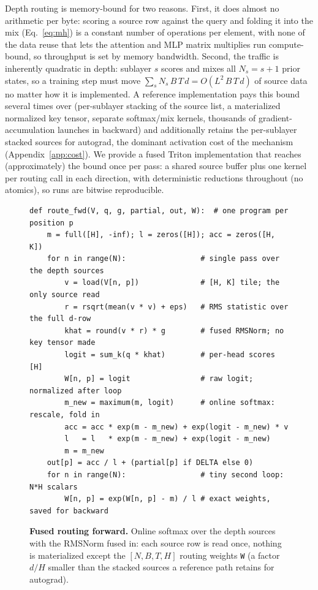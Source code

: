 \documentclass{article}
\begin{document}
Depth routing is memory-bound for two reasons. First, it does almost no
arithmetic per byte: scoring a source row against the query and folding it into
the mix (Eq.~\ref{eq:mh}) is a constant number of operations per element, with
none of the data reuse that lets the attention and MLP matrix multiplies run
compute-bound, so throughput is set by memory bandwidth. Second, the traffic is
inherently quadratic in depth: sublayer $s$ scores and mixes all $N_s{=}s{+}1$
prior states, so a training step must move
$\sum_s N_s\,B\,T\,d = O(L^2\,B\,T\,d)$ of source data no matter how it is
implemented. A reference implementation pays this bound several times over
(per-sublayer stacking of the source list, a materialized normalized key tensor,
separate softmax/mix kernels, thousands of gradient-accumulation launches in
backward) and additionally retains the per-sublayer stacked sources for
autograd, the dominant activation cost of the mechanism (Appendix~\ref{app:cost}). We provide a fused Triton implementation
that reaches (approximately) the bound once per pass: a shared source buffer plus
one kernel per routing call in each direction, with deterministic reductions
throughout (no atomics), so runs are bitwise reproducible.

\begin{figure}[h]
\begin{lstlisting}[style=mhar]
def route_fwd(V, q, g, partial, out, W):  # one program per position p
    m = full([H], -inf); l = zeros([H]); acc = zeros([H, K])
    for n in range(N):                 # single pass over the depth sources
        v = load(V[n, p])              # [H, K] tile; the only source read
        r = rsqrt(mean(v * v) + eps)   # RMS statistic over the full d-row
        khat = round(v * r) * g        # fused RMSNorm; no key tensor made
        logit = sum_k(q * khat)        # per-head scores  [H]
        W[n, p] = logit                # raw logit; normalized after loop
        m_new = maximum(m, logit)      # online softmax: rescale, fold in
        acc = acc * exp(m - m_new) + exp(logit - m_new) * v
        l   = l   * exp(m - m_new) + exp(logit - m_new)
        m = m_new
    out[p] = acc / l + (partial[p] if DELTA else 0)
    for n in range(N):                 # tiny second loop: N*H scalars
        W[n, p] = exp(W[n, p] - m) / l # exact weights, saved for backward
\end{lstlisting}
\caption{\textbf{Fused routing forward.} Online softmax over the depth sources
with the RMSNorm fused in: each source row is read once, nothing is
materialized except the $[N, B, T, H]$ routing weights \texttt{W} (a factor
$d/H$ smaller than the stacked sources a reference path retains for autograd).}
\label{fig:kernel_fwd}
\end{figure}
\end{document}
